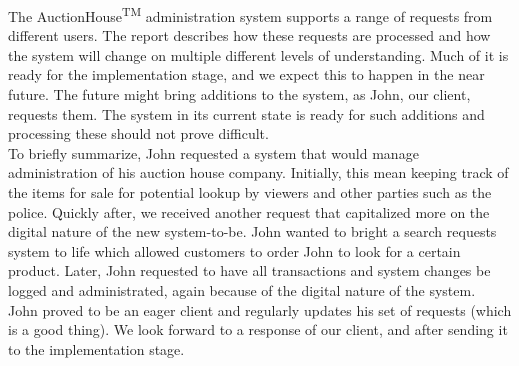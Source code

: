 The AuctionHouse\textsuperscript{TM} administration system supports a range of requests from different users. The report describes how these requests are processed and how the system will change on multiple different levels of understanding. Much of it is ready for the implementation stage, and we expect this to happen in the near future. The future might bring additions to the system, as John, our client, requests them. The system in its current state is ready for such additions and processing these should not prove difficult.\\
To briefly summarize, John requested a system that would manage administration of his auction house company. Initially, this mean keeping track of the items for sale for potential lookup by viewers and other parties such as the police. Quickly after, we received another request that capitalized more on the digital nature of the new system-to-be. John wanted to bright a search requests system to life which allowed customers to order John to look for a certain product. Later, John requested to have all transactions and system changes be logged and administrated, again because of the digital nature of the system.\\
John proved to be an eager client and regularly updates his set of requests (which is a good thing). We look forward to a response of our client, and after sending it to the implementation stage.